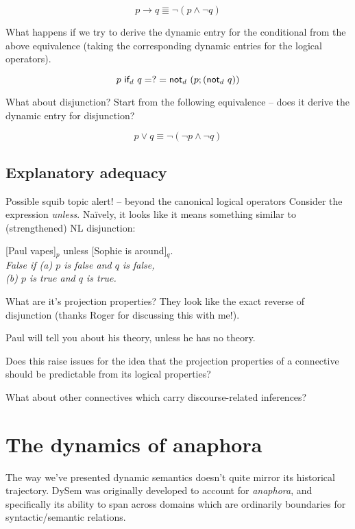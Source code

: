 \documentclass[cronos,landscape,paper=letter]{ling-handout}
\begin{document}
{\begin{tcolorbox}
    \[p → q ≣ ¬ (p ∧ ¬ q)\]

    What happens if we try to derive the dynamic entry for the conditional from the above equivalence (taking the corresponding dynamic entries for the logical operators).

    \[p \ml{if}_{d} q =?= \ml{not}_{d} (p;(\ml{not}_{d} q))\]

    What about disjunction? Start from the following equivalence -- does it derive the dynamic entry for disjunction?

    \[p ∨ q ≡ ¬ (¬ p ∧ ¬ q)\]

  \end{tcolorbox}

  \subsection{Explanatory adequacy}

  \begin{tcolorbox}
    Possible squib topic alert! -- beyond the canonical logical operators
    \tcblower
    Consider the expression \textit{unless}. Naïvely, it looks like it means something similar to (strengthened) NL disjunction:

    \ex
    {}[Paul vapes]\(_{p}\) unless [Sophie is around]\(_{q}\).\\
    \textit{False if (a) \(p\) is false and \(q\) is false,\\
      (b) \(p\) is true and \(q\) is true.}
    \xe

    What are it's projection properties? They look like the exact reverse of disjunction (thanks Roger for discussing this with me!).

    \ex
    Paul will tell you about his theory, unless he has no theory.
    \xe

    Does this raise issues for the idea that the projection properties of a connective should be predictable from its logical properties?

    What about other connectives which carry discourse-related inferences?
  \end{tcolorbox}

  \section{The dynamics of anaphora}

  The way we've presented dynamic semantics doesn't quite mirror its historical trajectory. DySem was originally developed to account for \textit{anaphora}, and specifically its ability to span across domains which are ordinarily boundaries for syntactic/semantic relations.

}
\end{document}
